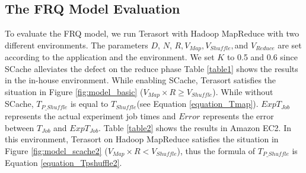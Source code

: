 \subsection{The FRQ Model Evaluation}\label{model_evaluation}
To evaluate the FRQ model, we run Terasort with Hadoop MapReduce with two different environments.
The parameters \(D\), \(N\), \(R, V_{Map}, V_{Shuffle},\)and \(V_{Reduce}\) are set according to the application and the environment.
We set \(K\) to 0.5 and 0.6 since SCache alleviates the defect on the reduce phase
Table \ref{table1} shows the results in the in-house environment.
While enabling SCache, Terasort satisfies the situation in Figure \ref{fig:model_basic} (\(V_{Map} \times R \ge V_{Shuffle}\)). 
While without SCache, \(T_{P\_Shuffle}\) is equal to \(T_{Shuffle}\)(see Equation \ref{equation_Tmap}).
\(ExpT_{Job}\) represents the actual experiment job times and
\(Error\) represents the error between \(T_{Job}\) and \(ExpT_{Job}\). 
Table \ref{table2} shows the results in Amazon EC2.
In this environment, Terasort on Hadoop MapReduce satisfies the situation in Figure \ref{fig:model_scache2} (\(V_{Map} \times R < V_{Shuffle}\)), thus the formula of \(T_{P\_Shuffle}\) is Equation \ref{equation_Tpshuffle2}. 

